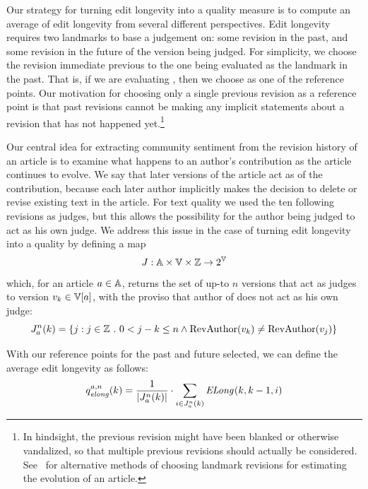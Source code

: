 Our strategy for turning edit longevity into a quality measure
is to compute an average of edit longevity from several different
perspectives.
Edit longevity requires two landmarks to base a judgement on:
some revision in the past, and some revision in the future of
the version being judged.
For simplicity, we choose the revision immediate previous to
the one being evaluated as the landmark in the past.
That is, if we are evaluating , then we choose
 as one of the reference points.
Our motivation for choosing only a single previous revision
as a reference point is that past revisions cannot be making
any implicit statements about a revision that has not happened
yet.\footnote{In hindsight, the previous revision might have been
blanked or otherwise vandalized, so that multiple previous revisions
should actually be considered.
See~\cite{Chatterjee2008} for alternative methods of choosing
landmark revisions for estimating the evolution of an article.}

Our central idea for extracting community sentiment from the
revision history of an article is to examine what happens to an
author's contribution as the article continues to evolve.
We say that later versions of the article act as 
of the contribution, because each later author implicitly makes
the decision to delete or revise existing text in the article.
For text quality we used the ten following revisions as judges,
but this allows the possibility for the author being judged
to act as his own judge.
We address this issue in the case of turning edit longevity into
a quality by defining a map
\begin{equation*}
J : \articles \times \versions{} \times \mathbb{Z} \to 2^\versions{}
\end{equation*}
which, for an article $a \in \mathbb{A}$,
returns the set of up-to $n$ versions that act as judges
to version $\version{k} \in \versions{a}$, with the proviso
that author of  does not act as his own judge:
\begin{equation}
\judges{a}{n}{k} = \{ j : j \in \mathbb{Z}\ .\ 0 < j - k \le n
    \wedge \revauthor{\version{k}} \ne \revauthor{\version{j}} \}
\label{def:judges}
\end{equation}

With our reference points for the past and future selected, we
can define the average edit longevity as follows:
\begin{equation}
\quality{elong}{a,n}{k} = \frac{1}{|\judges{a}{n}{k}|} \cdot
      \sum_{i \in \judges{a}{n}{k}} \esurv{}{k,k-1,i}
\label{def:elong}
\end{equation}

